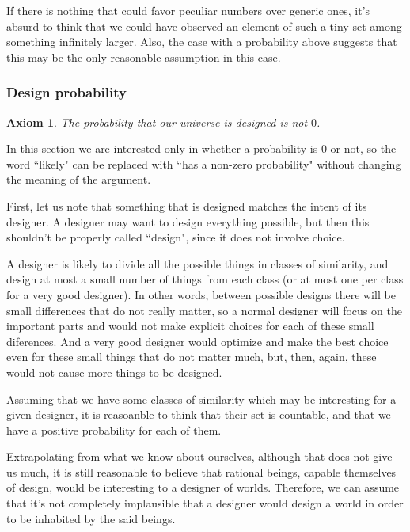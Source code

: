 \documentclass[a4paper
,draft
]{article}
\newcommand{\svn}[2][]{\todo[author=Virgil,color=red!25!white,#1]{#2}}
\newcommand{\ghilimele}[1]{``#1"}
\newtheorem{axiom}{Axiom}
\begin{document}
If there is nothing that could favor
peculiar numbers over generic ones, it's absurd to think that we could have
observed an element of such a tiny set among something infinitely larger.
Also, the case with a probability above suggests that this may be the only
reasonable assumption in this case.

\subsubsection{Design probability}

\begin{axiom}
  The probability that our universe is designed is not $0$.
\end{axiom}

\svn{quote/cite Swinburne}

In this section we are interested only in whether a probability is $0$ or not,
so the word \ghilimele{likely} can be replaced with
\ghilimele{has a non-zero probability} without changing
the meaning of the argument.

First, let us note that something that is designed matches the intent of
its designer. A designer may want to design everything possible, but then
this shouldn't be properly called \ghilimele{design}, since it does not involve
choice.

A designer is likely
to divide all the possible things in classes of similarity, and design at most
a small number of things from each class (or at most one per class for a very
good designer). In other words, between possible designs there will be small
differences that do not really matter, so a normal designer will focus on the
important parts and would not make explicit choices for each of these small
diferences. And a very good designer would optimize and make the best choice
even for these small things that do not matter much, but, then, again, these
would not cause more things to be designed.

Assuming that we have some classes of similarity which may be interesting for
a given designer, it is reasoanble to think that their set is countable,
and that we have a positive probability for each of them.

Extrapolating from what we know about ourselves, although that does
not give us much, it is still reasonable to believe that rational beings,
capable themselves of design, would be interesting to a designer of worlds.
Therefore, we can assume that it's not completely implausible that a designer
would design a world in order to be inhabited by the said beings.
\end{document}
